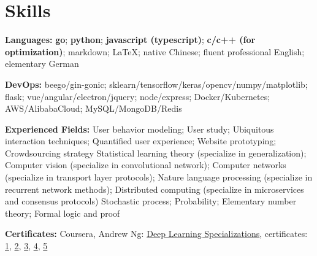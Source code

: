 \section{\textbf{Skills}}
\resumeSubHeadingListStart
\item{
  \textbf{Languages:}{ 
    \textbf{go}; \textbf{python}; 
    \textbf{javascript (typescript)}; 
    \textbf{c/c++ (for optimization)}; 
    markdown; \LaTeX; 
    native Chinese; fluent professional English; elementary German
  }
}
\item{
 \textbf{DevOps:}{
    beego/gin-gonic; 
    sklearn/tensorflow/keras/opencv/numpy/matplotlib; 
    flask; vue/angular/electron/jquery; 
    node/express; Docker/Kubernetes; 
    AWS/AlibabaCloud; 
    MySQL/MongoDB/Redis
  }
}
\item{
  \textbf{Experienced Fields:}{ 
    \resumeItemListStart
        { 
          User behavior modeling;
          User study; 
          Ubiquitous interaction techniques; 
          Quantified user experience; 
          Website prototyping; 
          Crowdsourcing strategy
        }
        { 
          Statistical learning theory (specialize in generalization); 
          Computer vision (specialize in convolutional network); 
          Computer networks (specialize in transport layer protocols); 
          Nature language processing (specialize in recurrent network methods); 
          Distributed computing (specialize in microservices and consensus protocols)
        }
        { 
          Stochastic process; 
          Probability; 
          Elementary number theory; 
          Formal logic and proof
        }
   \resumeItemListEnd
  }
}
\item{
  \textbf{Certificates:}{
    Coursera, Andrew Ng: \href{https://www.coursera.org/account/accomplishments/specialization/QGH8ZVJ6J2L2}{Deep Learning Specializations}, certificates:
    \href{https://www.coursera.org/account/accomplishments/verify/YH4NT7HHN263}{1}, 
    \href{https://www.coursera.org/account/accomplishments/verify/QGH3GNGF6BM4}{2}, 
    \href{https://www.coursera.org/account/accomplishments/verify/6VU45R2SZEF6}{3},
    \href{https://www.coursera.org/account/accomplishments/verify/LF3K9BQQDLVL}{4},
    \href{https://www.coursera.org/account/accomplishments/verify/JQFLW2DPYAGW}{5}
  }
}
\resumeSubHeadingListEnd